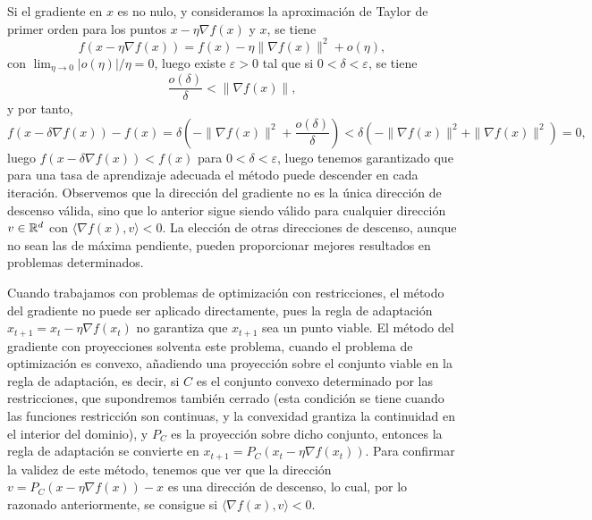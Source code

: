 \documentclass{book}
\begin{document}
Si el gradiente en $x$ es no nulo, y consideramos la aproximación de Taylor de primer orden para los puntos $x - \eta\nabla f(x)$ y $x$, se tiene
\[ f(x - \eta\nabla f(x)) = f(x) - \eta\|\nabla f(x)\|^2 + o(\eta),\]
con $\lim_{\eta \to 0}|o(\eta)|/\eta = 0$, luego existe $\varepsilon > 0$ tal que si $0 < \delta < \varepsilon$, se tiene
\[\frac{o(\delta)}{\delta} < \|\nabla f(x)\|, \]
y por tanto,
\[f(x - \delta\nabla f(x)) - f(x) = \delta\left(-\|\nabla f(x)\|^2+ \frac{o(\delta)}{\delta}\right) < \delta(-\|\nabla f(x)\|^2+\|\nabla f(x)\|^2) = 0, \]
luego $f(x - \delta\nabla f(x)) < f(x)$ para $0 < \delta < \varepsilon$, luego tenemos garantizado que para una tasa de aprendizaje adecuada el método puede descender en cada iteración. Observemos que la dirección del gradiente no es la única dirección de descenso válida, sino que lo anterior sigue siendo válido para cualquier dirección $v \in \mathbb{R}^d$ con $\langle \nabla f(x), v \rangle < 0$. La elección de otras direcciones de descenso, aunque no sean las de máxima pendiente, pueden proporcionar mejores resultados en problemas determinados.

Cuando trabajamos con problemas de optimización con restricciones, el método del gradiente no puede ser aplicado directamente, pues la regla de adaptación $x_{t+1} = x_t - \eta \nabla f(x_t)$ no garantiza que $x_{t+1}$ sea un punto viable. El método del gradiente con proyecciones solventa este problema, cuando el problema de optimización es convexo, añadiendo una proyección sobre el conjunto viable en la regla de adaptación, es decir, si $C$ es el conjunto convexo determinado por las restricciones, que supondremos también cerrado (esta condición se tiene cuando las funciones restricción son continuas, y la convexidad grantiza la continuidad en el interior del dominio), y $P_C$ es la proyección sobre dicho conjunto, entonces la regla de adaptación se convierte en $x_{t+1} = P_C(x_t - \eta \nabla f(x_t))$. Para confirmar la validez de este método, tenemos que ver que la dirección $v = P_C(x - \eta\nabla f(x)) - x$ es una dirección de descenso, lo cual, por lo razonado anteriormente, se consigue si $\langle \nabla f(x), v \rangle < 0$.
\end{document}
